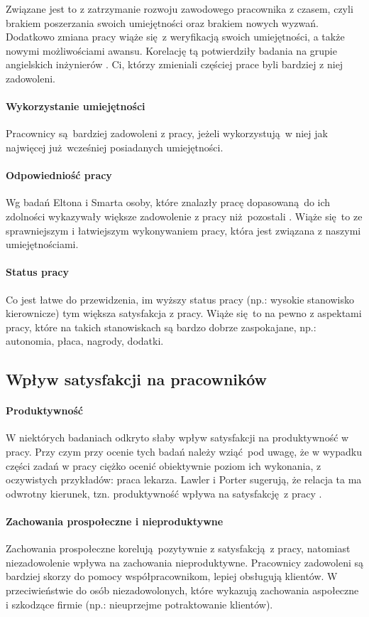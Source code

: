 Związane jest to z zatrzymanie rozwoju zawodowego pracownika z czasem, czyli brakiem poszerzania swoich umiejętności oraz brakiem nowych wyzwań. Dodatkowo zmiana pracy wiąże się z weryfikacją swoich umiejętności, a także nowymi możliwościami awansu. Korelację tą potwierdziły badania na grupie angielskich inżynierów \citep{newton1991further}. Ci, którzy zmieniali częściej prace byli bardziej z niej zadowoleni.
\paragraph{Wykorzystanie umiejętności} Pracownicy są bardziej zadowoleni z pracy, jeżeli wykorzystują w niej jak najwięcej już wcześniej posiadanych umiejętności.
\paragraph{Odpowiedniość pracy} Wg badań Eltona i Smarta osoby, które znalazły pracę dopasowaną do ich zdolności wykazywały większe zadowolenie z pracy niż pozostali \citep{elton1988extrinsic}. Wiąże się to ze sprawniejszym i łatwiejszym wykonywaniem pracy, która jest związana z naszymi umiejętnościami.
\paragraph{Status pracy} Co jest łatwe do przewidzenia, im wyższy status pracy (np.: wysokie stanowisko kierownicze) tym większa satysfakcja z pracy. Wiąże się to na pewno z aspektami pracy, które na takich stanowiskach są bardzo dobrze zaspokajane, np.: autonomia, płaca, nagrody, dodatki.

\subsection{Wpływ satysfakcji na pracowników}
\paragraph{Produktywność} W niektórych badaniach odkryto słaby wpływ satysfakcji na produktywność w pracy. Przy czym przy ocenie tych badań należy wziąć pod uwagę, że w wypadku części zadań w pracy ciężko ocenić obiektywnie poziom ich wykonania, z oczywistych przykładów: praca lekarza. Lawler i Porter sugerują, że relacja ta ma odwrotny kierunek, tzn. produktywność wpływa na satysfakcję z pracy \citep{lawler1967effect}.
\paragraph{Zachowania prospołeczne i nieproduktywne} Zachowania prospołeczne korelują pozytywnie z satysfakcją z pracy, natomiast niezadowolenie wpływa na zachowania nieproduktywne. Pracownicy zadowoleni są bardziej skorzy do pomocy współpracownikom, lepiej obsługują klientów. W przeciwieństwie do osób niezadowolonych, które wykazują zachowania aspołeczne i szkodzące firmie (np.: nieuprzejme potraktowanie klientów).
